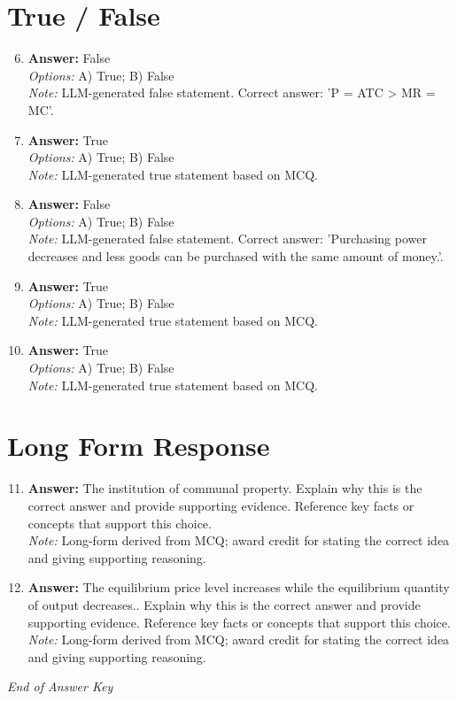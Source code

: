 \documentclass[12pt]{article}
\begin{document}
\section*{True / False}
\begin{enumerate}[label=\arabic*.]
\setcounter{enumi}{5}
\item \textbf{Answer:} False
\\ \textit{Options:} A) True; B) False
\\ \textit{Note:} LLM-generated false statement. Correct answer: 'P = ATC \textgreater{} MR = MC'.
\item \textbf{Answer:} True
\\ \textit{Options:} A) True; B) False
\\ \textit{Note:} LLM-generated true statement based on MCQ.
\item \textbf{Answer:} False
\\ \textit{Options:} A) True; B) False
\\ \textit{Note:} LLM-generated false statement. Correct answer: 'Purchasing power decreases and less goods can be purchased with the same amount of money.'.
\item \textbf{Answer:} True
\\ \textit{Options:} A) True; B) False
\\ \textit{Note:} LLM-generated true statement based on MCQ.
\item \textbf{Answer:} True
\\ \textit{Options:} A) True; B) False
\\ \textit{Note:} LLM-generated true statement based on MCQ.
\end{enumerate}

\section*{Long Form Response}
\begin{enumerate}[label=\arabic*.]
\setcounter{enumi}{10}
\item \textbf{Answer:} The institution of communal property. Explain why this is the correct answer and provide supporting evidence. Reference key facts or concepts that support this choice.
\\ \textit{Note:} Long-form derived from MCQ; award credit for stating the correct idea and giving supporting reasoning.
\item \textbf{Answer:} The equilibrium price level increases while the equilibrium quantity of output decreases.. Explain why this is the correct answer and provide supporting evidence. Reference key facts or concepts that support this choice.
\\ \textit{Note:} Long-form derived from MCQ; award credit for stating the correct idea and giving supporting reasoning.
\end{enumerate}

\vfill
\noindent\textit{End of Answer Key}
\end{document}
